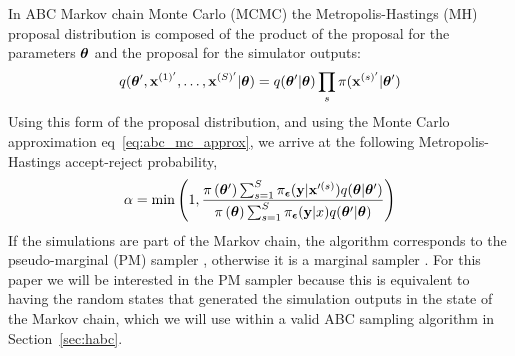 \documentclass[]{article}
\begin{document}
In ABC Markov chain Monte Carlo (MCMC) \cite{marjoram2003markov,Wilkinson2013,sisson:2010} the Metropolis-Hastings (MH) proposal distribution is composed of the product of the proposal for the parameters ${\bm \theta}$ and the proposal for the simulator outputs:
\begin{equation}
  q( {\bm \theta^{\prime}}, {\bf x}^{(1)'}, \ldots, {\bf x}^{(S)'} | {\bm \theta} ) =  q( {\bm \theta^{\prime}} | {\bm \theta} ) \prod_s \pi( {\bf x}^{(s)'} | {\bm \theta^{\prime}})
\end{equation}
Using this form of the proposal distribution, and using the Monte Carlo approximation eq~\ref{eq:abc_mc_approx}, we arrive at the following Metropolis-Hastings accept-reject probability,
%
\begin{equation}
\alpha = \min \left( 1, \frac{\pi\left({\bm \theta^{\prime}}\right) \sum_{s=1}^S \pi_{{\bm {\epsilon}}}({\bf y} | {\bf x}^{\prime(s)} )  q( {\bm \theta} | {\bm \theta^{\prime}} )}{\pi\left({\bm \theta}\right) \sum_{s=1}^S \pi_{{\bm {\epsilon}}}({\bf y} | x ) q( {\bm \theta^{\prime}} | {\bm \theta} )} \right) \label{eq:abc_mh_acceptance_with_s}
\end{equation}
%
If the simulations are part of the Markov chain, the algorithm corresponds to the pseudo-marginal (PM) sampler \cite{andrieu2009pseudo}, otherwise it is a marginal sampler \cite{marjoram2003markov,sisson:2010}.   For this paper we will be interested in the PM sampler because this is equivalent to having the random states that generated the simulation outputs in the state of the Markov chain, which we will use within a valid ABC sampling algorithm in Section~\ref{sec:habc}.
%
\end{document}

